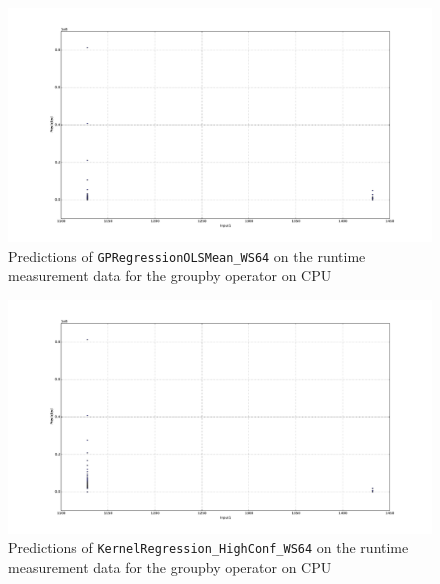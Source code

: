 \begin{figure}[htbp]
  \centering
    \includegraphics[width=\linewidth]{./Figures/gpreg_olsmean_ws64_ocl_groupby_on_device_on_cpu.pdf}
  \caption{Predictions of \texttt{GPRegressionOLSMean\_WS64} on the runtime measurement data for the groupby operator on CPU}
  \label{gpreg_olsmean_ws64_ocl_groupby_on_device_on_cpu}
\end{figure}

\begin{figure}[htbp]
  \centering
    \includegraphics[width=\linewidth]{./Figures/kreg_ws64_ocl_groupby_on_device_on_cpu.pdf}
  \caption{Predictions of \texttt{KernelRegression\_HighConf\_WS64} on the runtime measurement data for the groupby operator on CPU}
  \label{kreg_ws64_ocl_groupby_on_device_on_cpu}
\end{figure}

